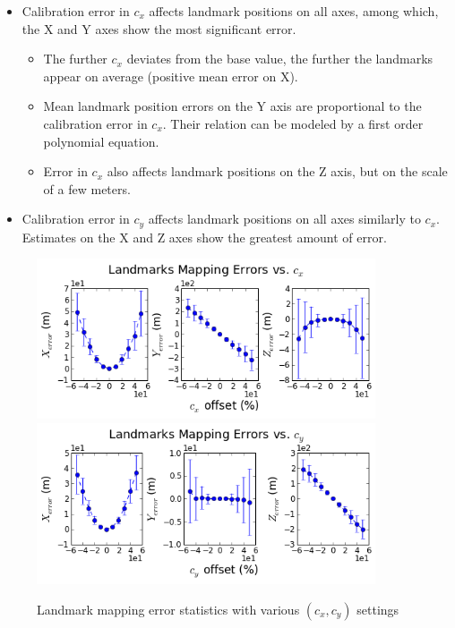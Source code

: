 \begin{itemize}
  \item Calibration error in $c_{x}$ affects landmark positions on all
  axes, among which, the X and Y axes show the most significant error.
  \begin{itemize}
    \item The further $c_{x}$ deviates from the base value, the further
    the landmarks appear on average (positive mean error on X).
    \item Mean landmark position errors on the Y axis are proportional to
    the calibration error in $c_x$. Their relation can be modeled by a
    first order polynomial equation.
    \item Error in $c_{x}$ also affects landmark positions on the Z
    axis, but on the scale of a few meters.
  \end{itemize}
  \item Calibration error in $c_{y}$ affects landmark positions on
  all axes similarly to $c_{x}$. Estimates on the X and Z axes show the
  greatest amount of error.
\end{itemize}

\begin{figure}[h] %
  \centering
  \includegraphics[width=10cm, keepaspectratio=true]{./Figures/SimulationFigures/Figure28.png}
  \includegraphics[width=10cm, keepaspectratio=true]{./Figures/SimulationFigures/Figure29.png}
  \caption{Landmark mapping error statistics with various $(c_x, c_y)$
  settings}
  \label{fig:simfig28-29}
\end{figure}

